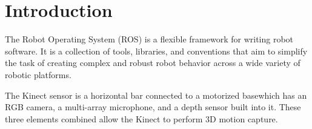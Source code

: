 \chapter{Introduction}

The Robot Operating System (ROS) is a flexible framework for writing robot software. It is a collection of tools, libraries, and conventions that aim to simplify the task of creating complex and robust robot behavior across a wide variety of robotic platforms.

\vspace{20pt}

The Kinect sensor is a horizontal bar connected to a motorized basewhich has an RGB camera, a multi-array microphone, and a depth sensor built into it. These three elements combined allow the Kinect to perform 3D motion capture.


